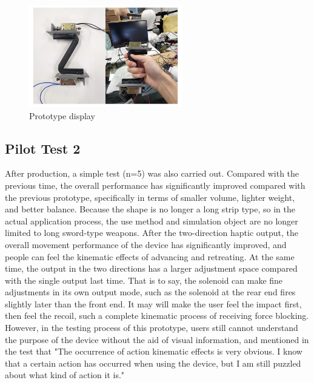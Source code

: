 \begin{figure}[h]
\centering
\includegraphics[width=0.6\textwidth]{A_thesis/figures/025.png}
\caption{Prototype display}
\end{figure}

\subsection{Pilot Test 2}
After production, a simple test (n=5) was also carried out. Compared with the previous time, the overall performance has significantly improved compared with the previous prototype, specifically in terms of smaller volume, lighter weight, and better balance. Because the shape is no longer a long strip type, so in the actual application process, the use method and simulation object are no longer limited to long sword-type weapons.
After the two-direction haptic output, the overall movement performance of the device has significantly improved, and people can feel the kinematic effects of advancing and retreating. At the same time, the output in the two directions has a larger adjustment space compared with the single output last time. That is to say, the solenoid can make fine adjustments in its own output mode, such as the solenoid at the rear end fires slightly later than the front end. It may will make the user feel the impact first, then feel the recoil, such a complete kinematic process of receiving force blocking.
However, in the testing process of this prototype, users still cannot understand the purpose of the device without the aid of visual information, and mentioned in the test that "The occurrence of action kinematic effects is very obvious. I know that a certain action has occurred when using the device, but I am still puzzled about what kind of action it is."

